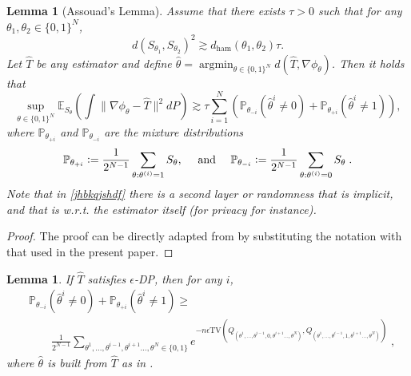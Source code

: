 \documentclass{article}
\theoremstyle{plain}
\newtheorem{lemma}[theorem]{Lemma}
\theoremstyle{definition}
\theoremstyle{remark}
\newcommand{\Prob}[0]{\mathbb{P}}
\newcommand{\E}[0]{\mathbb{E}}
\newcommand{\argmin}[0]{\operatorname{argmin}}
\newcommand{\eqdef}{\vcentcolon=}
\newcommand\tv[2]{\mathrm{TV}\left( {#1}, {#2} \right)}
\newcommand\ham[2]{d_\mathrm{ham}\left( {#1}, {#2} \right)}
\newcommand\p[1]{\left( {#1}\right)}
\begin{document}
    \begin{lemma}[Assouad's Lemma]
\label{lemma:Assouad}
    Assume that there exists $\tau > 0$ such that for any $\theta_1, \theta_2 \in \{0, 1 \}^{N}$, 
    \begin{equation}
        d(S_{\theta_1}, S_{\theta_2})^2
        \gtrsim \ham{\theta_1}{\theta_2} \tau.
    \end{equation}
    Let $\hat{T}$ be any estimator and define $\hat{\theta} = \argmin_{\theta \in \{0,1\}^N} d(\hat T, \nabla \phi_\theta)$. 
    Then it holds that
    \begin{equation}
    \label{jhbkqjshdf}
        \sup_{\theta \in \{0, 1 \}^{N}} \E_{S_{\theta}} \p{\int \| \nabla \phi_{\theta} - \hat{T}  \|^2 dP}
        \gtrsim \tau \sum_{i=1}^{N} \p{\Prob_{{{\theta_{-i}}}} (\hat{\theta}^i \neq 0) + \Prob_{{{\theta_{+i}}}} (\hat{\theta}^i \neq 1)},
    \end{equation}
    where $\Prob_{{{\theta_{+i}}}}$ and $\Prob_{{{\theta_{-i}}}}$ are the mixture distributions
    \begin{equation}
        \Prob_{{{\theta_{+i}}}} \eqdef \frac{1}{2^{N-1}} \sum_{\theta: \theta^{(i)} = 1} S_{\theta}, \quad \text{ and } \quad \Prob_{{{\theta_{-i}}}} \eqdef \frac{1}{2^{N-1}} \sum_{\theta: \theta^{(i)} = 0} S_{\theta}\;.
    \end{equation}
    Note that in \eqref{jhbkqjshdf} there is a second layer or randomness that is implicit, and that is w.r.t. the estimator itself (for privacy for instance).
\end{lemma}
\begin{proof}
    The proof can be directly adapted from \cite{acharya2021differentially} by substituting the notation with that used in the present paper.
\end{proof}

\begin{lemma}
\label{lemma:lecamassouad}
    If $\hat{T}$ satisfies $\epsilon$-DP, then for any $i$,
    \begin{equation}
    \begin{aligned}
    &\Prob_{{{\theta_{-i}}}} (\hat{\theta}^i \neq 0) + \Prob_{{{\theta_{+i}}}} (\hat{\theta}^i \neq 1)
    \geq \\
    &\quad\quad
    \frac{1}{2^{N-1}}\sum_{\theta^1, \dots, \theta^{i-1}, \theta^{i+1} \dots, \theta^{N} \in \{0, 1 \}} e^{-n \epsilon \tv{Q_{(\theta^1, \dots, \theta^{i-1}, 0, \theta^{i+1} \dots, \theta^{N})}}{Q_{(\theta^1, \dots, \theta^{i-1}, 1, \theta^{i+1} \dots, \theta^{N})}}} \;,
    \end{aligned}
\end{equation}
where $\hat{\theta}$ is built from $\hat{T}$ as in .
\end{lemma} 
\end{document}
